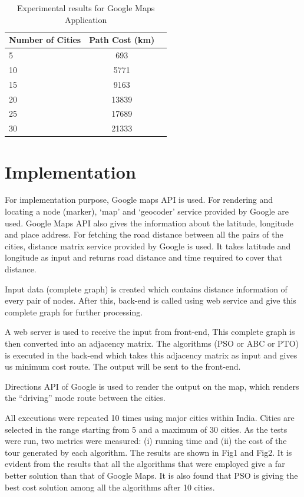 \documentclass[conference]{IEEEtran}
\begin{document}
\begin{table}[h!]
  \begin{center}
    \label{tab:table4} \caption{Experimental results for Google Maps Application}
    \begin{tabular}{l|c|r}
      \textbf{Number of Cities} & \textbf{Path Cost (km)}\\
      \hline
      5 & 693\\
      10 & 5771\\
      15 & 9163\\
      20 & 13839\\ 
      25 & 17689\\
      30 & 21333\\
    \end{tabular}
    
  \end{center}
\end{table}


\section {Implementation}

For implementation purpose, Google maps API is used. For rendering and locating a node (marker), ‘map’ and ‘geocoder’ service provided by Google are used. Google Maps API also gives the information about the latitude, longitude and place address. For fetching the road distance between all the pairs of the cities, distance matrix service provided by Google is used. It takes latitude and longitude as input and returns road distance and time required to cover that distance.

Input data (complete graph) is created which contains distance information of every pair of nodes. After this, back-end is called using web service and give this complete graph for further processing.

A web server is used to receive the input from front-end, This complete graph is then converted into an adjacency matrix. The algorithms (PSO or ABC or PTO) is executed in the back-end which takes this adjacency matrix as input and gives us minimum cost route. The output will be sent to the front-end.

Directions API of Google is used to render the output on the map, which renders the “driving” mode route between the cities.

All executions were repeated 10 times using major cities within India. Cities are selected in the range starting from 5 and a maximum of 30 cities. As the tests were run, two metrics were measured: (i) running time and (ii) the cost of the tour generated by each algorithm. The results are shown in Fig1 and Fig2. It is evident from the results that all the algorithms that were employed give a far better solution than that of Google Maps. It is also found that PSO is giving the best cost solution among all the algorithms after 10 cities.
\end{document}
